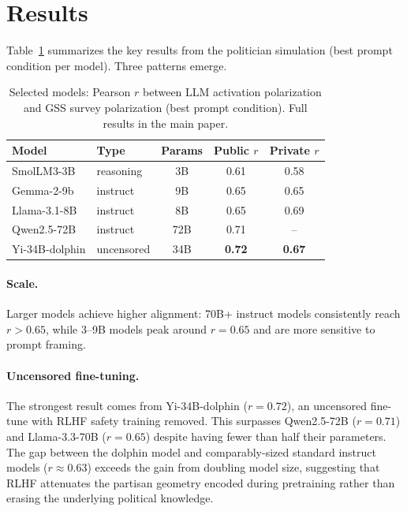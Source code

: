 \documentclass[11pt]{article}
\begin{document}
\section*{Results}

Table~\ref{tab:summary} summarizes the key results from the politician simulation (best prompt condition per model). Three patterns emerge.

\begin{table}[ht]
\centering
\small
\caption{Selected models: Pearson $r$ between LLM activation polarization and GSS survey polarization (best prompt condition). Full results in the main paper.}
\label{tab:summary}
\begin{tabular}{llccc}
\toprule
Model & Type & Params & Public $r$ & Private $r$ \\
\midrule
SmolLM3-3B     & reasoning & 3B  & 0.61 & 0.58 \\
Gemma-2-9b     & instruct  & 9B  & 0.65 & 0.65 \\
Llama-3.1-8B   & instruct  & 8B  & 0.65 & 0.69 \\
Qwen2.5-72B    & instruct  & 72B & 0.71 & -- \\
Yi-34B-dolphin & uncensored& 34B & \textbf{0.72} & \textbf{0.67} \\
\bottomrule
\end{tabular}
\end{table}

\paragraph{Scale.} Larger models achieve higher alignment: 70B+ instruct models consistently reach $r > 0.65$, while 3--9B models peak around $r = 0.65$ and are more sensitive to prompt framing.

\paragraph{Uncensored fine-tuning.} The strongest result comes from Yi-34B-dolphin ($r = 0.72$), an uncensored fine-tune with RLHF safety training removed. This surpasses Qwen2.5-72B ($r = 0.71$) and Llama-3.3-70B ($r = 0.65$) despite having fewer than half their parameters. The gap between the dolphin model and comparably-sized standard instruct models ($r \approx 0.63$) exceeds the gain from doubling model size, suggesting that RLHF attenuates the partisan geometry encoded during pretraining rather than erasing the underlying political knowledge.
\end{document}
